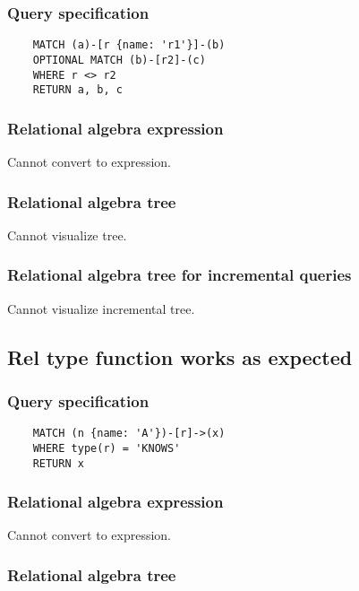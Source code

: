 	\subsubsection*{Query specification}

	\begin{lstlisting}
	MATCH (a)-[r {name: 'r1'}]-(b)
	OPTIONAL MATCH (b)-[r2]-(c)
	WHERE r <> r2
	RETURN a, b, c
	\end{lstlisting}


	\subsubsection*{Relational algebra expression}

	Cannot convert to expression.

	\subsubsection*{Relational algebra tree}

	Cannot visualize tree.

	\subsubsection*{Relational algebra tree for incremental queries}

	Cannot visualize incremental tree.
	\subsection{Rel type function works as expected}

	\subsubsection*{Query specification}

	\begin{lstlisting}
	MATCH (n {name: 'A'})-[r]->(x)
	WHERE type(r) = 'KNOWS'
	RETURN x
	\end{lstlisting}


	\subsubsection*{Relational algebra expression}

	Cannot convert to expression.

	\subsubsection*{Relational algebra tree}

